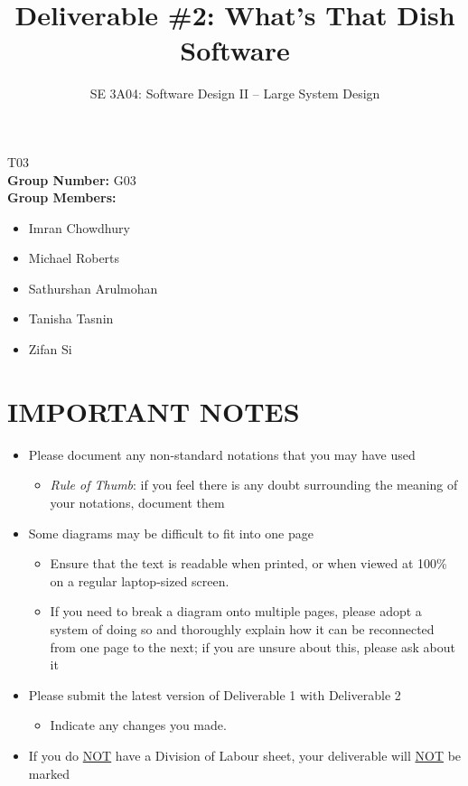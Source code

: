\documentclass[]{article}
\title{Deliverable \#2: What’s That Dish Software}
\author{SE 3A04: Software Design II -- Large System Design}
\date{}
\begin{document}
\maketitle	
{} T03\\
{\bf Group Number:} G03 \\
{\bf Group Members:} 
\begin{itemize}
	\item Imran Chowdhury
	\item Michael Roberts
	\item Sathurshan Arulmohan
	\item Tanisha Tasnin
	\item Zifan Si
\end{itemize}

\section*{IMPORTANT NOTES}
\begin{itemize}
	\item Please document any non-standard notations that you may have used
	\begin{itemize}
		\item \emph{Rule of Thumb}: if you feel there is any doubt surrounding the meaning of your notations, document them
	\end{itemize}
	\item Some diagrams may be difficult to fit into one page
	\begin{itemize}
		\item Ensure that the text is readable when printed, or when viewed at 100\% on a regular laptop-sized screen.
		\item If you need to break a diagram onto multiple pages, please adopt a system of doing so and thoroughly explain how it can be reconnected from one page to the next; if you are unsure about this, please ask about it
	\end{itemize}
	\item Please submit the latest version of Deliverable 1 with Deliverable 2
	\begin{itemize}
		\item Indicate any changes you made.
	\end{itemize}
	\item If you do \underline{NOT} have a Division of Labour sheet, your deliverable will \underline{NOT} be marked
\end{itemize}
\end{document}
